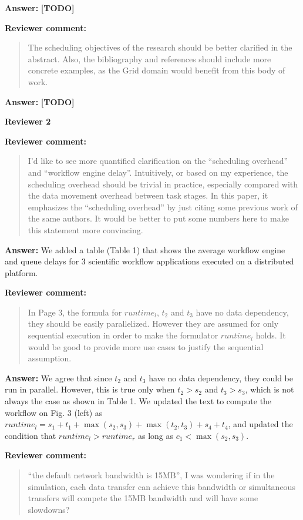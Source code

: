 \documentclass{letter}
\newenvironment{review}%
{\textbf{Reviewer comment:}\begin{quote}}%
{\end{quote}}%
\newcommand{\todo}[1]{%
      \color{red}\textbf{[TODO]} #1\color{black}}
\newcommand{\answer}[1]{%
      \textbf{Answer:} #1}
\begin{document}
\begin{letter}{}
\answer{\todo{}}



\begin{review}
The scheduling objectives of the research should be better clarified in the abstract. Also, the bibliography and references should include more concrete examples, as the Grid domain would benefit from this body of work. 
\end{review}

\answer{\todo{}}



\newpage

%
%
\textbf{Reviewer 2}

\begin{review}
I'd like to see more quantified clarification on the ``scheduling overhead'' and ``workflow engine delay''. Intuitively, or based on my experience, the scheduling overhead should be trivial in practice, especially compared with the data movement overhead between task stages. In this paper, it emphasizes the ``scheduling overhead'' by just citing some previous work of the same authors. It would be better to put some numbers here to make this statement more convincing. 
\end{review}

\answer{We added a table (Table 1) that shows the average workflow engine and queue delays for 3 scientific workflow applications executed on a distributed platform.}



\begin{review}
In Page 3, the formula for $runtime_l$, $t_2$ and $t_3$ have no data dependency, they should be easily parallelized. However they are assumed for only sequential execution in order to make the formulator $runtime_l$ holds. It would be good to provide more use cases to justify the sequential assumption.
\end{review}

\answer{We agree that since $t_2$ and $t_3$ have no data dependency, they could be run in parallel. However, this is true only when $t_2 > s_2$ and $t_3 > s_3$, which is not always the case as shown in Table 1. We updated the text to compute the workflow on Fig. 3 (left) as $runtime_l= s_1+t_1+\max(s_2,s_3)+\max(t_2,t_3)+s_4+t_4$, and updated the condition that $runtime_l > runtime_r$ as long as $c_1 < \max(s_2,s_3)$.}




\begin{review}
``the default network bandwidth is 15MB'', I was wondering if in the simulation, each data transfer can achieve this bandwidth or simultaneous transfers will compete the 15MB bandwidth and will have some slowdowns?
\end{review}


\end{letter}
\end{document}
